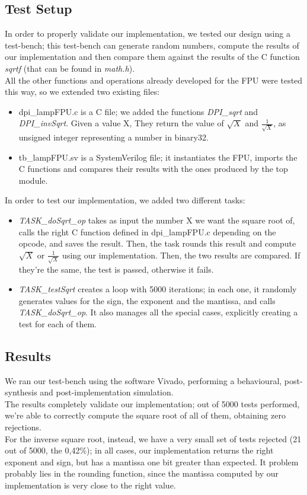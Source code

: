 \subsection{Test Setup}
In order to properly validate our implementation, we tested our design using a test-bench; this test-bench can generate random numbers, compute the results of our implementation and then compare them against the results of the C function \emph{sqrtf} (that can be found in \emph{math.h}).  \\
All the other functions and operations already developed for the FPU were tested this way, so we extended two existing files:
\begin{itemize}
\item dpi\_lampFPU.c is a C file; we added the functions \emph{DPI\_sqrt} and \emph{DPI\_invSqrt}. Given a value X, They return the value of $\sqrt{X}$ and $\frac{1}{\sqrt{X}}$, as unsigned integer representing a number in binary32.
\item tb\_lampFPU.sv is a SystemVerilog file; it instantiates the FPU, imports the C functions and compares their results with the ones produced by the top module. 
\end{itemize}

In order to test our implementation, we added two different tasks:
\begin{itemize}
\item \emph{TASK\_doSqrt\_op} takes as input the number X we want the square root of, calls the right C function defined in dpi\_lampFPU.c depending on the opcode, and saves the result. Then, the task rounds this result and compute $\sqrt{X}$ or $\frac{1}{\sqrt{X}}$ using our implementation. Then, the two results are compared. If they're the same, the test is passed, otherwise it fails. 
\item \emph{TASK\_testSqrt} creates a loop with 5000 iterations; in each one, it randomly generates values for the sign, the exponent and the mantissa, and calls \emph{TASK\_doSqrt\_op}. It also manages all the special cases, explicitly creating a test for each of them. 
\end{itemize}

\subsection{Results}
We ran our test-bench using the software Vivado, performing a behavioural, post-synthesis and post-implementation simulation.\\
The results completely validate our implementation; out of 5000 tests performed, we're able to correctly compute the square root of all of them, obtaining zero rejections. \\
For the inverse square root, instead, we have a very small set of tests rejected (21 out of 5000, the 0,42\%); in all cases, our implementation returns the right exponent and sign, but has a mantissa one bit greater than expected. It problem probably lies in the rounding function, since the mantissa computed by our implementation is very close to the right value.  

